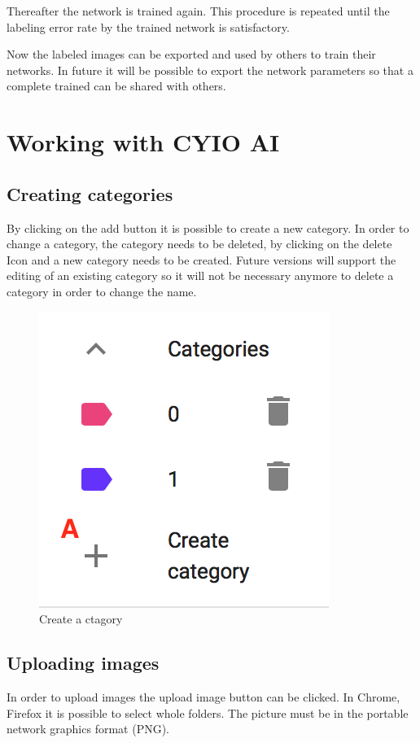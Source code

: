 Thereafter the network is trained again. This procedure is 
repeated until the labeling error rate by the trained
network is satisfactory.

Now the labeled images can be exported and used by others
to train their networks. In future it will be possible to
export the network parameters so that a complete trained
can be shared with others.


\section{Working with CYIO AI}

\subsection{Creating categories}
By clicking on the add button it is possible to create a new
category. In order to change a category, the category needs to be deleted, by clicking on the delete Icon and a new category needs to be created. Future versions will support the editing of an existing category so it will not be necessary anymore to delete a category in order to change the name.
\begin{figure}[H]
	\centering
	\includegraphics[scale=0.8]{bilder/cyto/categories.png}
	\caption{Create a ctagory}
	\label{fig:Category}
\end{figure}

\subsection{Uploading images}
In order to upload images the upload image button can be clicked. In Chrome, Firefox it is possible to select 
whole folders. The picture must be in the portable network graphics format (PNG).

